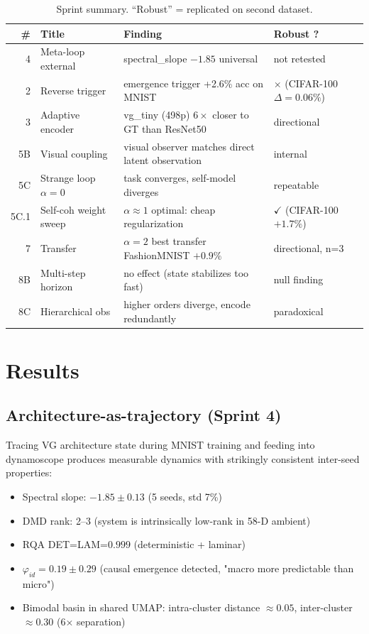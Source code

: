 \documentclass[11pt]{article}
\begin{document}
\begin{table}[h]
\caption{Sprint summary. ``Robust'' = replicated on second dataset.}
\label{tab:sprints}
\centering\small
\begin{tabular}{rlll}
\toprule
\# & Title & Finding & Robust ? \\
\midrule
4 & Meta-loop external & spectral\_slope $-1.85$ universal & not retested \\
2 & Reverse trigger & emergence trigger +2.6\% acc on MNIST & $\times$ (CIFAR-100 $\Delta=0.06\%$) \\
3 & Adaptive encoder & vg\_tiny (498p) $6\times$ closer to GT than ResNet50 & directional \\
5B & Visual coupling & visual observer matches direct latent observation & internal \\
5C & Strange loop $\alpha{=}0$ & task converges, self-model diverges & repeatable \\
5C.1 & Self-coh weight sweep & $\alpha{\approx}1$ optimal: cheap regularization & $\checkmark$ (CIFAR-100 $+1.7\%$) \\
7 & Transfer & $\alpha{=}2$ best transfer FashionMNIST $+0.9\%$ & directional, n=3 \\
8B & Multi-step horizon & no effect (state stabilizes too fast) & null finding \\
8C & Hierarchical obs & higher orders diverge, encode redundantly & paradoxical \\
\bottomrule
\end{tabular}
\end{table}

\section{Results}

\subsection{Architecture-as-trajectory (Sprint 4)}
Tracing VG architecture state during MNIST training and feeding into dynamoscope produces measurable dynamics with strikingly consistent inter-seed properties:

\begin{itemize}
    \item Spectral slope: $-1.85 \pm 0.13$ (5 seeds, std 7\%)
    \item DMD rank: 2--3 (system is intrinsically low-rank in 58-D ambient)
    \item RQA DET=LAM=$0.999$ (deterministic + laminar)
    \item $\varphi_{id} = 0.19 \pm 0.29$ (causal emergence detected, "macro more predictable than micro")
    \item Bimodal basin in shared UMAP: intra-cluster distance $\approx 0.05$, inter-cluster $\approx 0.30$ (6$\times$ separation)
\end{itemize}
\end{document}
